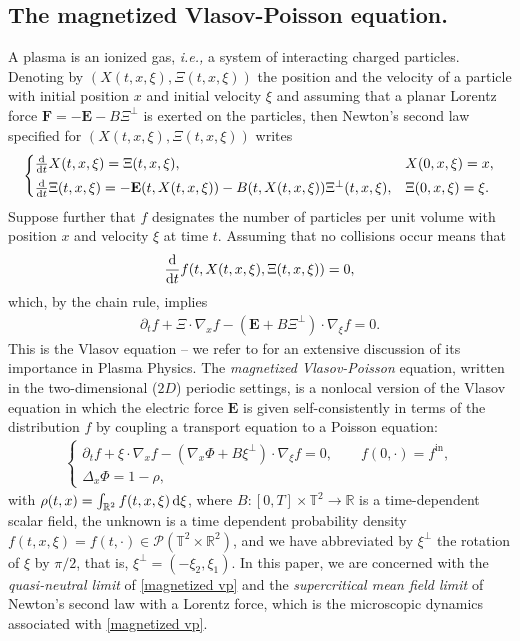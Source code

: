 \documentclass[11pt,reqno]{amsart}
\numberwithin{equation}{section}
\def\dd{{\rm d}}
\begin{document}
\subsection{The magnetized Vlasov-Poisson equation.} 
A plasma is an ionized gas, {\it i.e.,} a system of interacting charged particles. Denoting by $(X(t,x,\xi),\Xi(t,x,\xi))$ the position and the velocity 
of a particle with initial position $x$ and initial  velocity $\xi$ and assuming that a planar Lorentz force $\mathbf{F}=-\mathbf{E}- B\Xi^{\perp}$ is exerted on the particles, then Newton's second law specified for $(X(t,x,\xi),\Xi(t,x,\xi))$ writes 
\begin{align*}
\begin{cases}
\frac{\dd}{\dd t}X(t,x,\xi)=\Xi(t,x,\xi), & X(0,x,\xi)=x,\\[1mm]
\frac{\dd}{\dd t}\Xi(t,x,\xi)=-\mathbf{E}(t,X(t,x,\xi))- B(t,X(t,x,\xi))\Xi^{\perp}(t,x,\xi),& \Xi(0,x,\xi)=\xi. 
\end{cases}    
\end{align*}
Suppose further that $f$ designates the number of particles per unit volume with position $x$ and velocity $\xi$ at time $t$. 
Assuming that no collisions occur means that 
$$
\frac{\dd }{\dd t}f(t,X(t,x,\xi),\Xi(t,x,\xi))=0,
$$ 
which, by the chain rule, implies 
\begin{align*}
\partial_{t}f+\Xi\cdot \nabla_{x}f-(\mathbf{E}+B\Xi^{\perp})\cdot\nabla_{\xi}f=0.  \label{}   
\end{align*}
This is the Vlasov equation -- we refer to \cite[Chapter 7]{chen2015introduction}  for an extensive discussion of its importance in Plasma Physics. The \textit{magnetized Vlasov-Poisson} equation, written in the two-dimensional ($2D$) periodic settings, is a nonlocal version of the Vlasov equation 
in which the electric force $\mathbf{E}$ is given self-consistently in terms of the distribution $f$ by coupling a  transport equation to a Poisson equation: 
\begin{align}\tag{VPB}
\begin{cases}
\partial_{t}f+\xi\cdot \nabla_{x}f-(\nabla_{x}\Phi+ B\xi^{\perp})\cdot\nabla_{\xi} f=0, \qquad f(0,\cdot)=f^{\mathrm{in}},\\[1mm]
\Delta_{x} \Phi=1-\rho,
\end{cases}
\label{magnetized vp}
\end{align}
with $\rho(t,x)=\int_{\mathbb{R}^{2}} f(t,x,\xi)\,\dd \xi$,
where $B:[0,T]\times \mathbb{T}^{2}\rightarrow \mathbb{R}$ is a time-dependent 
scalar field, the unknown is a time dependent probability density $f(t,x,\xi)=f(t,\cdot)\in \mathcal{P}(\mathbb{T}^{2}\times \mathbb{R}^{2})$, 
and we have abbreviated by $\xi^{\perp}$ the rotation of $\xi$ by $\pi/2$, 
that is, $\xi^{\perp}=(-\xi_{2},\xi_{1})$. 
In this paper, we are concerned with the \textit{quasi-neutral limit}  of \eqref{magnetized vp} and the \textit{supercritical mean field limit} 
of Newton's second law with a Lorentz force, which is the microscopic dynamics associated with \eqref{magnetized vp}. 
\end{document}
